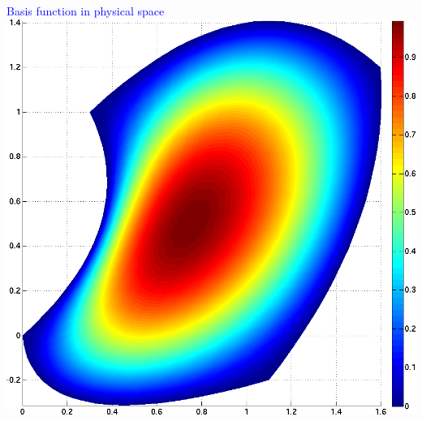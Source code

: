 \documentclass[8pt,xcolor=svgnames]{beamer}
\begin{document}
\begin{frame}
\begin{columns}
\begin{column}{0.6\textwidth}
\begin{columns}[t]
\begin{column}{0.5\textwidth}
\begin{center}
    \medskip
    \tiny{\textcolor{blue}{Basis function in physical space}}
    \includegraphics[height=0.4\textheight,keepaspectratio=true]{./Images/Q2Basis_Physical.png}
   \end{center}
   \end{column}
   \end{columns}
  \end{column}
 \end{columns}
\end{frame}
\end{document}
